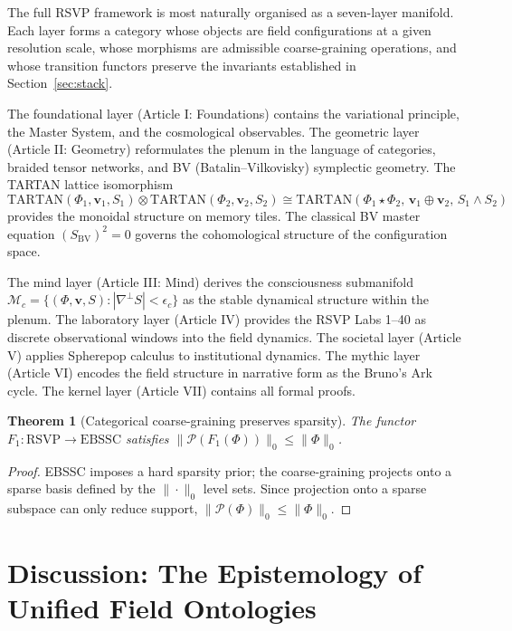 \documentclass[12pt, a4paper]{article}
\theoremstyle{plain}
\newtheorem{theorem}{Theorem}[section]
\theoremstyle{definition}
\theoremstyle{remark}
\newcommand{\vfield}{\mathbf{v}}
\begin{document}
The full RSVP framework is most naturally organised as a seven-layer manifold. Each layer forms a category whose objects are field configurations at a given resolution scale, whose morphisms are admissible coarse-graining operations, and whose transition functors preserve the invariants established in Section~\ref{sec:stack}.

The foundational layer (Article I: Foundations) contains the variational principle,
the Master System, and the cosmological observables.  The geometric layer (Article II:
Geometry) reformulates the plenum in the language of categories, braided tensor networks,
and BV (Batalin--Vilkovisky) symplectic geometry.  The TARTAN lattice isomorphism
\[
\mathrm{TARTAN}(\Phi_1,\vfield_1,S_1) \otimes \mathrm{TARTAN}(\Phi_2,\vfield_2,S_2)
\cong \mathrm{TARTAN}(\Phi_1\star\Phi_2,\,\vfield_1\oplus\vfield_2,\,S_1\wedge S_2)
\]
provides the monoidal structure on memory tiles.  The classical BV master equation
$(S_{\mathrm{BV}})^2 = 0$ governs the cohomological structure of the configuration space.

The mind layer (Article III: Mind) derives the consciousness submanifold
$\mathcal{M}_c = \{(\Phi,\vfield,S) : |\nabla^\perp S| < \epsilon_c\}$ as the stable
dynamical structure within the plenum.  The laboratory layer (Article IV) provides
the RSVP Labs 1--40 as discrete observational windows into the field dynamics.  The
societal layer (Article V) applies Spherepop calculus to institutional dynamics.
The mythic layer (Article VI) encodes the field structure in narrative form as the
Bruno's Ark cycle.  The kernel layer (Article VII) contains all formal proofs.

\begin{theorem}[Categorical coarse-graining preserves sparsity]
The functor $F_1 : \mathrm{RSVP} \to \mathrm{EBSSC}$ satisfies $\|\mathcal{P}(F_1(\Phi))\|_0 \leq \|\Phi\|_0$.
\end{theorem}

\begin{proof}
EBSSC imposes a hard sparsity prior; the coarse-graining projects onto a sparse basis
defined by the $\|\cdot\|_0$ level sets.  Since projection onto a sparse subspace can only
reduce support, $\|\mathcal{P}(\Phi)\|_0 \leq \|\Phi\|_0$.
\end{proof}

\section{Discussion: The Epistemology of Unified Field Ontologies}
\label{sec:discussion}
\end{document}
